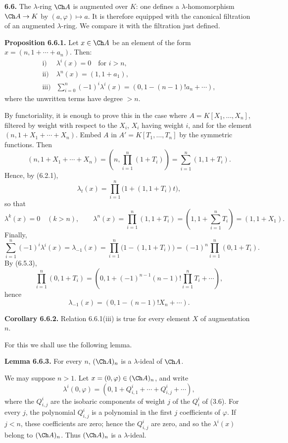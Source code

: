 \textbf{6.6.} The \(\lambda\)-ring \(\Ch A\) is augmented over \(K\): one defines a \(\lambda\)-homomorphism \(\Ch A\to K\) by \((a,\varphi)\mapsto a\). It is therefore equipped with the canonical filtration of an augmented \(\lambda\)-ring. We compare it with the filtration just defined.

\textbf{Proposition 6.6.1.} Let \(x\in\Ch A\) be an element of the form \(x=(n,1+\cdots+a_n)\). Then:
\[
\begin{array}{ll}
\text{i)}& \lambda^i(x)=0\quad\text{for }i>n,\\[0.3em]
\text{ii)}& \lambda^n(x)=(1,1+a_1),\\[0.3em]
\text{iii)}& \displaystyle\sum_{i=0}^n(-1)^i\lambda^i(x)
       =(0,1-(n-1)!a_n+\cdots),
\end{array}
\]
where the unwritten terms have degree \(>n\).

By functoriality, it is enough to prove this in the case where
\(A=K[X_1,\ldots,X_n]\), filtered by weight with respect to the \(X_i\), \(X_i\) having weight \(i\), and for the element \((n,1+X_1+\cdots+X_n)\). Embed \(A\) in \(A'=K[T_1,\ldots,T_n]\) by the symmetric functions. Then
\[
 (n,1+X_1+\cdots+X_n)
 =
 \left(n,\prod_{i=1}^n(1+T_i)\right)
 =
 \sum_{i=1}^n(1,1+T_i).
\]
Hence, by (6.2.1),
\[
  \lambda_t(x)=\prod_{i=1}^n\bigl(1+(1,1+T_i)t\bigr),
\]
so that
\[
  \lambda^k(x)=0\quad(k>n),\qquad
  \lambda^n(x)=\prod_{i=1}^n(1,1+T_i)
   =\left(1,1+\sum_{i=1}^nT_i\right)=(1,1+X_1).
\]
Finally,
\[
  \sum_{i=1}^n(-1)^i\lambda^i(x)=\lambda_{-1}(x)
  =\prod_{i=1}^n\bigl(1-(1,1+T_i)\bigr)
  =(-1)^n\prod_{i=1}^n(0,1+T_i).
\]
By (6.5.3),
\[
  \prod_{i=1}^n(0,1+T_i)
  =
  \left(0,1+(-1)^{n-1}(n-1)!\prod_{i=1}^nT_i+\cdots\right),
\]
hence
\[
  \lambda_{-1}(x)=(0,1-(n-1)!X_n+\cdots).
\]

\textbf{Corollary 6.6.2.} Relation 6.6.1(iii) is true for every element \(X\) of augmentation \(n\).

For this we shall use the following lemma.

\textbf{Lemma 6.6.3.} For every \(n\), \((\Ch A)_n\) is a \(\lambda\)-ideal of \(\Ch A\).

We may suppose \(n>1\). Let \(x=(0,\varphi)\in(\Ch A)_n\), and write
\[
  \lambda^i(0,\varphi)=(0,1+Q^i_{i,1}+\cdots+Q^i_{i,j}+\cdots),
\]
where the \(Q^i_{i,j}\) are the isobaric components of weight \(j\) of the \(Q^i_i\) of (3.6). For every \(j\), the polynomial \(Q^i_{i,j}\) is a polynomial in the first \(j\) coefficients of \(\varphi\). If \(j<n\), these coefficients are zero; hence the \(Q^i_{i,j}\) are zero, and so the \(\lambda^i(x)\) belong to \((\Ch A)_n\). Thus \((\Ch A)_n\) is a \(\lambda\)-ideal.

